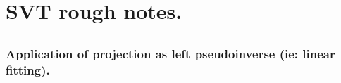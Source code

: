 
%


%
%

\chapter{SVT rough notes.}



\section{}


















\subsection{Application of projection as left pseudoinverse (ie: linear fitting). }


%

